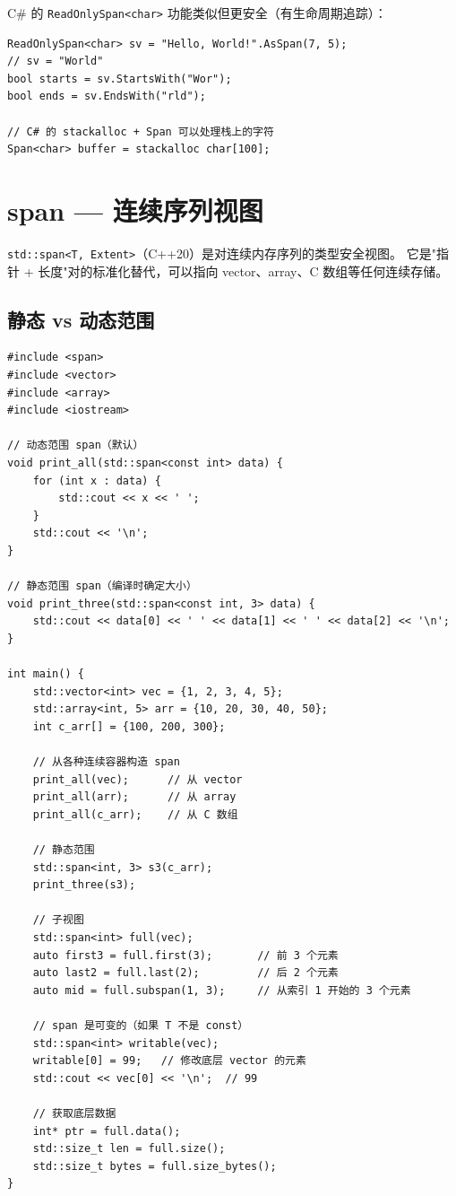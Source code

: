 \documentclass[12pt,a4paper,fontset=fandol]{ctexbook}
\newcommand{\cpp}[1]{C++#1}
\newcommand{\Tp}[1]{\texttt{#1}}
\begin{document}
\begin{compare}
C\# 的 \texttt{ReadOnlySpan<char>} 功能类似但更安全（有生命周期追踪）：
\begin{lstlisting}[style=csharpstyle]
ReadOnlySpan<char> sv = "Hello, World!".AsSpan(7, 5);
// sv = "World"
bool starts = sv.StartsWith("Wor");
bool ends = sv.EndsWith("rld");

// C# 的 stackalloc + Span 可以处理栈上的字符
Span<char> buffer = stackalloc char[100];
\end{lstlisting}
\end{compare}

\chapter{span --- 连续序列视图}

\Tp{std::span<T, Extent>}（\cpp{20}）是对连续内存序列的类型安全视图。
它是"指针 + 长度"对的标准化替代，可以指向 vector、array、C 数组等任何连续存储。

\section{静态 vs 动态范围}

\begin{lstlisting}
#include <span>
#include <vector>
#include <array>
#include <iostream>

// 动态范围 span（默认）
void print_all(std::span<const int> data) {
    for (int x : data) {
        std::cout << x << ' ';
    }
    std::cout << '\n';
}

// 静态范围 span（编译时确定大小）
void print_three(std::span<const int, 3> data) {
    std::cout << data[0] << ' ' << data[1] << ' ' << data[2] << '\n';
}

int main() {
    std::vector<int> vec = {1, 2, 3, 4, 5};
    std::array<int, 5> arr = {10, 20, 30, 40, 50};
    int c_arr[] = {100, 200, 300};

    // 从各种连续容器构造 span
    print_all(vec);      // 从 vector
    print_all(arr);      // 从 array
    print_all(c_arr);    // 从 C 数组

    // 静态范围
    std::span<int, 3> s3(c_arr);
    print_three(s3);

    // 子视图
    std::span<int> full(vec);
    auto first3 = full.first(3);       // 前 3 个元素
    auto last2 = full.last(2);         // 后 2 个元素
    auto mid = full.subspan(1, 3);     // 从索引 1 开始的 3 个元素

    // span 是可变的（如果 T 不是 const）
    std::span<int> writable(vec);
    writable[0] = 99;   // 修改底层 vector 的元素
    std::cout << vec[0] << '\n';  // 99

    // 获取底层数据
    int* ptr = full.data();
    std::size_t len = full.size();
    std::size_t bytes = full.size_bytes();
}
\end{lstlisting}
\end{document}
